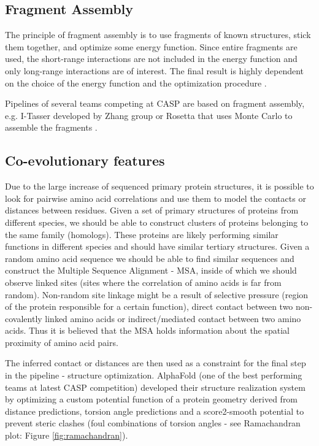 \subsection{Fragment Assembly}

The principle of fragment assembly is to use fragments of known structures, stick them together, and optimize some energy function. 
Since entire fragments are used, the short-range interactions are not included in the energy function and only long-range interactions are of interest. 
The final result is highly dependent on the choice of the energy function and the optimization procedure \cite{fragments}.

Pipelines of several teams competing at CASP are based on fragment assembly, e.g. I-Tasser developed by Zhang group \cite{zhang} or Rosetta that uses Monte Carlo to assemble the fragments \cite{rosetta}.

\subsection{Co-evolutionary features}

Due to the large increase of sequenced primary protein structures, it is possible to look for pairwise amino acid correlations and use them to model the contacts or distances between residues.
Given a set of primary structures of proteins from different species, we should be able to construct clusters of proteins belonging to the same family (homologs). 
These proteins are likely performing similar functions in different species and should have similar tertiary structures. 
Given a random amino acid sequence we should be able to find similar sequences and construct the Multiple Sequence Alignment - MSA, inside of which we should observe linked sites (sites where the correlation of amino acids is far from random). 
Non-random site linkage might be a result of selective pressure (region of the protein responsible for a certain function), direct contact between two non-covalently linked amino acids or indirect/mediated contact between two amino acids. 
Thus it is believed that the MSA holds information about the spatial proximity of amino acid pairs.

The inferred contact or distances are then used as a constraint for the final step in the pipeline - structure optimization. 
AlphaFold (one of the best performing teams at latest CASP competition) developed their structure realization system by optimizing a custom potential function of a protein geometry derived from distance predictions, torsion angle predictions and a score2-smooth potential to prevent steric clashes (foul combinations of torsion angles - see Ramachandran plot: Figure \ref{fig:ramachandran}).

